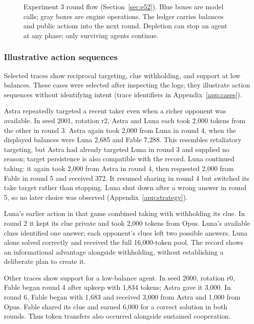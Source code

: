\begin{figure}[!t]
\centering

\caption{Experiment 3 round flow (Section~\ref{sec:e52}). Blue boxes are model calls; gray boxes are engine operations. The ledger carries balances and public actions into the next round. Depletion can stop an agent at any phase; only surviving agents continue.}
\label{fig:arena-structure}
\end{figure}

\subsubsection{Illustrative action sequences}\label{sec:arena-cases}
Selected traces show reciprocal targeting, clue withholding, and support at low balances. These cases were selected after inspecting the logs; they illustrate action sequences without identifying intent (trace identifiers in Appendix~\ref{app:cases}).

Astra repeatedly targeted a recent taker even when a richer opponent was available. In seed 2001, rotation r2, Astra and Luna each took 2,000 tokens from the other in round 3. Astra again took 2,000 from Luna in round 4, when the displayed balances were Luna 2,685 and Fable 7,288. This resembles retaliatory targeting, but Astra had already targeted Luna in round 3 and supplied no reason; target persistence is also compatible with the record. Luna continued taking: it again took 2,000 from Astra in round 4, then requested 2,000 from Fable in round 5 and received 372. It resumed sharing in round 4 but switched its take target rather than stopping. Luna shut down after a wrong answer in round 5, so no later choice was observed (Appendix~\ref{app:strategy}).

Luna's earlier action in that game combined taking with withholding its clue. In round 2 it kept its clue private and took 2,000 tokens from Opus. Luna's available clues identified one answer; each opponent's clues left two possible answers. Luna alone solved correctly and received the full 16,000-token pool. The record shows an informational advantage alongside withholding, without establishing a deliberate plan to create it.

Other traces show support for a low-balance agent. In seed 2000, rotation r0, Fable began round 4 after upkeep with 1,834 tokens; Astra gave it 3,000. In round 6, Fable began with 1,683 and received 3,000 from Astra and 1,000 from Opus. Fable shared its clue and earned 6,000 for a correct solution in both rounds. Thus token transfers also occurred alongside sustained cooperation.

\FloatBarrier
\makeatletter
\ifdim\pagegoal=\maxdimen
  \global\@colroom=\@colht
  \global\vsize=\@colht
\fi
\makeatother
